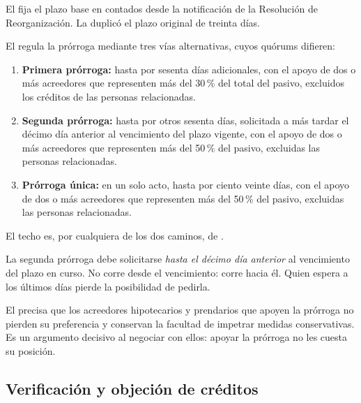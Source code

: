 El   fija el plazo base en  contados desde la
notificación de la Resolución de Reorganización. La \Lreforma{} duplicó el plazo original de
treinta días.

El  regula la prórroga mediante tres vías alternativas, cuyos quórums difieren:

\begin{enumerate}
  \item \textbf{Primera prórroga:} hasta por sesenta días adicionales, con el apoyo de dos o
  más acreedores que representen más del 30\,\% del total del pasivo, excluidos los créditos
  de las personas relacionadas.

  \item \textbf{Segunda prórroga:} hasta por otros sesenta días, solicitada a más tardar el
  décimo día anterior al vencimiento del plazo vigente, con el apoyo de dos o más acreedores
  que representen más del 50\,\% del pasivo, excluidas las personas relacionadas.

  \item \textbf{Prórroga única:} en un solo acto, hasta por ciento veinte días, con el apoyo
  de dos o más acreedores que representen más del 50\,\% del pasivo, excluidas las personas
  relacionadas.
\end{enumerate}

El techo es, por cualquiera de los dos caminos, de .

\begin{practica}
La segunda prórroga debe solicitarse \emph{hasta el décimo día anterior} al vencimiento del
plazo en curso. No corre desde el vencimiento: corre hacia él. Quien espera a los últimos
días pierde la posibilidad de pedirla.
\end{practica}

\begin{foco}
El  precisa que los acreedores hipotecarios y prendarios que apoyen la prórroga no
pierden su preferencia y conservan la facultad de impetrar medidas conservativas. Es un
argumento decisivo al negociar con ellos: apoyar la prórroga no les cuesta su posición.
\end{foco}

\subsection{Verificación y objeción de créditos}

